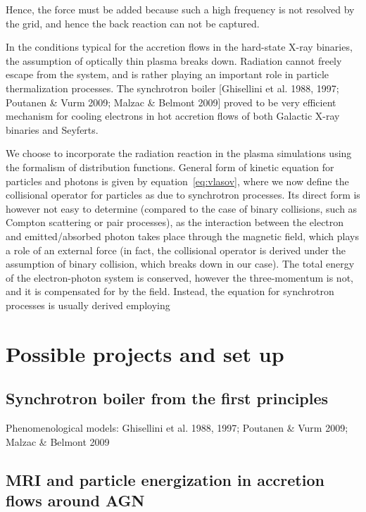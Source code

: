 \documentclass{aa}
\begin{document}
Hence, the force must be added because such a high frequency is not resolved by the grid, and hence the back reaction can not be captured.


In the conditions typical for the accretion flows in the hard-state X-ray binaries, the assumption of optically thin plasma breaks down.
Radiation cannot freely escape from the system, and is rather playing an important role in particle thermalization processes.
The synchrotron boiler [Ghisellini et al. 1988, 1997; Poutanen \& Vurm 2009; Malzac \& Belmont 2009] proved to be very efficient mechanism for cooling 
electrons in hot accretion flows of both Galactic X-ray binaries and Seyferts.

We choose to incorporate the radiation reaction in the plasma simulations using the formalism of distribution functions.
General form of kinetic equation for particles and photons is given by equation~\ref{eq:vlasov}, where we now define the collisional operator for particles as 
due to synchrotron processes.
Its direct form is however not easy to determine (compared to the case of binary collisions, such as Compton scattering or pair processes), as the interaction 
between the electron and emitted/absorbed photon takes place through the magnetic field, which plays a role of an external force (in fact, the collisional operator 
is derived under the assumption of binary collision, which breaks down in our case).
The total energy of the electron-photon system is conserved, however the three-momentum is not, and it is compensated for by the field.
Instead, the equation for synchrotron processes is usually derived employing 





\section{Possible projects and set up}

\subsection{Synchrotron boiler from the first principles}

Phenomenological models: Ghisellini et al. 1988, 1997; Poutanen \& Vurm 2009; Malzac \& Belmont 2009


\subsection{MRI and particle energization in accretion flows around AGN} 
\end{document}
